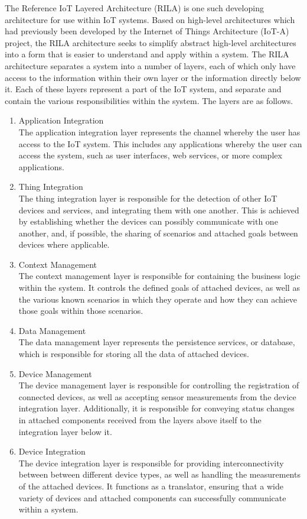 \documentclass{article}
\begin{document}
		The Reference IoT Layered Architecture (RILA) is one such 
		developing architecture for use within IoT systems. Based on 
		high-level architectures which had previously been developed by 
		the Internet of Things Architecture (IoT-A) project, the RILA 
		architecture seeks to simplify abstract high-level architectures 
		into a form that is easier to understand and apply within a 
		system. The RILA architecture separates a system into a number of 
		layers, each of which only have access to the information within 
		their own layer or the information directly below it. Each of 
		these layers represent a part of the IoT system, and separate and 
		contain the various responsibilities within the system. The 
		layers are as follows.
		
		\begin{enumerate}
			\item Application Integration\\
			The application integration layer represents the channel 
			whereby the user has access to the IoT system. This includes 
			any applications whereby the user can access the system, such 
			as user interfaces, web services, or more complex 
			applications.
			\item Thing Integration\\
			The thing integration layer is responsible for the detection 
			of other IoT devices and services, and integrating them with 
			one another. This is achieved by establishing whether the 
			devices can possibly communicate with one another, and, if 
			possible, the sharing of scenarios and attached goals between 
			devices where applicable.
			\item Context Management\\
			The context management layer is responsible for containing 
			the business logic within the system. It controls the defined 
			goals of attached devices, as well as the various known 
			scenarios in which they operate and how they can achieve 
			those goals within those scenarios.
			\item Data Management\\
			The data management layer represents the persistence 
			services, or database, which is responsible for storing all 
			the data of attached devices.
			\item Device Management\\
			The device management layer is responsible for controlling 
			the registration of connected devices, as well as accepting 
			sensor measurements from the device integration layer. 
			Additionally, it is responsible for conveying status changes 
			in attached components received from the layers above itself 
			to the integration layer below it.
			\item Device Integration\\
			The device integration layer is responsible for providing 
			interconnectivity between between different device types, as 
			well as handling the measurements of the attached devices. It 
			functions as a translator, ensuring that a wide variety of 
			devices and attached components can successfully communicate 
			within a system.
		\end{enumerate}
		
\end{document}
